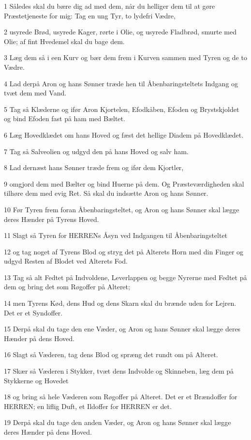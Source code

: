 \par 1 Således skal du bære dig ad med dem, når du helliger dem til at gøre Præstetjeneste for mig: Tag en ung Tyr, to lydefri Vædre,
\par 2 usyrede Brød, usyrede Kager, rørte i Olie, og usyrede Fladbrød, smurte med Olie; af fint Hvedemel skal du bage dem.
\par 3 Læg dem så i een Kurv og bær dem frem i Kurven sammen med Tyren og de to Vædre.
\par 4 Lad derpå Aron og hans Sønner træde hen til Åbenbaringsteltets Indgang og tvæt dem med Vand.
\par 5 Tag så Klæderne og ifør Aron Kjortelen, Efodkåben, Efoden og Brystskjoldet og bind Efoden fast på ham med Bæltet.
\par 6 Læg Hovedklædet om hans Hoved og fæst det hellige Diadem på Hovedklædet.
\par 7 Tag så Salveolien og udgyd den på hans Hoved og salv ham.
\par 8 Lad dernæst hans Sønner træde frem og ifør dem Kjortler,
\par 9 omgjord dem med Bælter og bind Huerne på dem. Og Præsteværdigheden skal tilhøre dem med evig Ret. Så skal du indsætte Aron og hans Sønner.
\par 10 Før Tyren frem foran Åbenbaringsteltet, og Aron og hans Sønner skal lægge deres Hænder på Tyrens Hoved.
\par 11 Slagt så Tyren for HERRENs Åsyn ved Indgangen til Åbenbaringsteltet
\par 12 og tag noget af Tyrens Blod og stryg det på Alterets Horn med din Finger og udgyd Resten af Blodet ved Alterets Fod.
\par 13 Tag så alt Fedtet på Indvoldene, Leverlappen og begge Nyrerne med Fedtet på dem og bring det som Røgoffer på Alteret;
\par 14 men Tyrens Kød, dens Hud og dens Skarn skal du brænde uden for Lejren. Det er et Syndoffer.
\par 15 Derpå skal du tage den ene Væder, og Aron og hans Sønner skal lægge deres Hænder på dens Hoved.
\par 16 Slagt så Væderen, tag dens Blod og spræng det rundt om på Alteret.
\par 17 Skær så Væderen i Stykker, tvæt dens Indvolde og Skinneben, læg dem på Stykkerne og Hovedet
\par 18 og bring så hele Væderen som Røgoffer på Alteret. Det er et Brændoffer for HERREN; en liflig Duft, et Ildoffer for HERREN er det.
\par 19 Derpå skal du tage den anden Væder, og Aron og hans Sønner skal lægge deres Hænder på dens Hoved.
